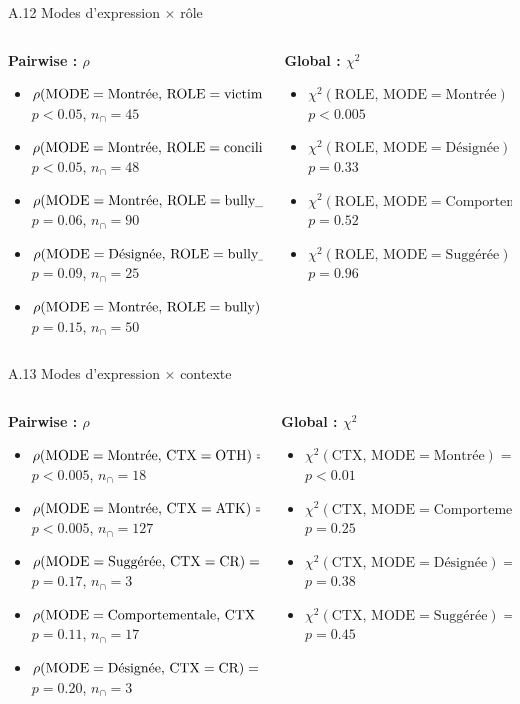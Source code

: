\documentclass[aspectratio=169,10pt,xcolor=table]{beamer}
\newcommand{\pval}[1]{\ensuremath{#1}}
\newcommand{\pos}[1]{\textcolor{Positive}{#1}}
\newcommand{\negcorr}[1]{\textcolor{Negative}{#1}}
\newcommand{\rhoitem}[7]{\item \(\rho(\mathrm{#1}=\text{#2},\,\mathrm{#3}=\text{#4}) = #5\)\\[-0.15em]{\tiny \(p\pval{#6}\), \(n_{\cap}=#7\)}}
\newcommand{\chiitem}[5]{\item \(\chi^2(\mathrm{#1},\,\mathrm{#2}=\text{#3}) = #4\)\\[-0.15em]{\tiny \(p\pval{#5}\)}}
\begin{document}
\begin{frame}{A.12 Modes d'expression × rôle}
\scriptsize
\begin{columns}[T,onlytextwidth]
\begin{column}{0.49\textwidth}
\textbf{Pairwise : \(\rho\)}
\begin{itemize}
\setlength\itemsep{0.55em}
\rhoitem{MODE}{Montrée}{ROLE}{victim}{\pos{0.09}}{<0.05}{45}
\rhoitem{MODE}{Montrée}{ROLE}{conciliator}{\negcorr{-0.08}}{<0.05}{48}
\rhoitem{MODE}{Montrée}{ROLE}{bully\_support}{\negcorr{-0.07}}{=0.06}{90}
\rhoitem{MODE}{Désignée}{ROLE}{bully\_support}{\pos{0.07}}{=0.09}{25}
\rhoitem{MODE}{Montrée}{ROLE}{bully}{\pos{0.06}}{=0.15}{50}
\end{itemize}
\end{column}
\begin{column}{0.49\textwidth}
\textbf{Global : \(\chi^2\)}
\begin{itemize}
\setlength\itemsep{0.55em}
\chiitem{ROLE}{MODE}{Montrée}{15.37}{<0.005}
\chiitem{ROLE}{MODE}{Désignée}{4.60}{=0.33}
\chiitem{ROLE}{MODE}{Comportementale}{3.21}{=0.52}
\chiitem{ROLE}{MODE}{Suggérée}{0.66}{=0.96}
\end{itemize}
\end{column}
\end{columns}
\end{frame}

\begin{frame}{A.13 Modes d'expression × contexte}
\scriptsize
\begin{columns}[T,onlytextwidth]
\begin{column}{0.49\textwidth}
\textbf{Pairwise : \(\rho\)}
\begin{itemize}
\setlength\itemsep{0.55em}
\rhoitem{MODE}{Montrée}{CTX}{OTH}{\negcorr{-0.13}}{<0.005}{18}
\rhoitem{MODE}{Montrée}{CTX}{ATK}{\pos{0.12}}{<0.005}{127}
\rhoitem{MODE}{Suggérée}{CTX}{CR}{\pos{0.07}}{=0.17}{3}
\rhoitem{MODE}{Comportementale}{CTX}{ATK}{\pos{0.07}}{=0.11}{17}
\rhoitem{MODE}{Désignée}{CTX}{CR}{\pos{0.07}}{=0.20}{3}
\end{itemize}
\end{column}
\begin{column}{0.49\textwidth}
\textbf{Global : \(\chi^2\)}
\begin{itemize}
\setlength\itemsep{0.55em}
\chiitem{CTX}{MODE}{Montrée}{19.34}{<0.01}
\chiitem{CTX}{MODE}{Comportementale}{9.08}{=0.25}
\chiitem{CTX}{MODE}{Désignée}{7.53}{=0.38}
\chiitem{CTX}{MODE}{Suggérée}{6.77}{=0.45}
\end{itemize}
\end{column}
\end{columns}
\end{frame}
\end{document}
